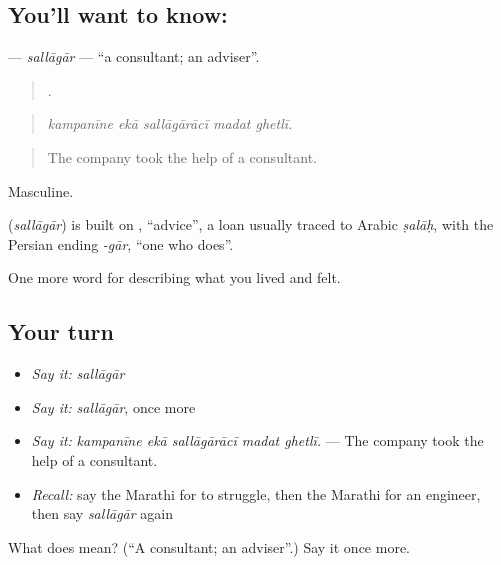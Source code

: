 \subsection*{You'll want to know: }
\textbf{} — \emph{sallāgār} — \textquotedblleft{}a consultant; an adviser\textquotedblright{}.

\begin{quote}
    .
\end{quote}

\begin{quote}
\emph{kampanīne ekā sallāgārācī madat ghetlī.}
\end{quote}

\begin{quote}
The company took the help of a consultant.
\end{quote}

Masculine.

\begin{cousinweb}
\textbf{} (\emph{sallāgār}) is built on , \textquotedblleft{}advice\textquotedblright{}, a loan usually traced to Arabic \emph{ṣalāḥ}, with the Persian ending \emph{-gār}, \textquotedblleft{}one who does\textquotedblright{}.
\end{cousinweb}

\begin{grammarlens}[title={What you've built}]
One more word for describing what you lived and felt.
\end{grammarlens}

\subsection*{Your turn}
\begin{itemize}
\raggedright
  \item \emph{Say it:} \emph{sallāgār}
  \item \emph{Say it:} \emph{sallāgār}, once more
  \item \emph{Say it:} \emph{kampanīne ekā sallāgārācī madat ghetlī.} — The company took the help of a consultant.
  \item \emph{Recall:} say the Marathi for to struggle, then the Marathi for an engineer, then say \emph{sallāgār} again
\end{itemize}

\begin{tcolorbox}[breakable,colback=teal!4,colframe=teal!35!black,title={Before you move on}]
What does  mean? (\textquotedblleft{}A consultant; an adviser\textquotedblright{}.) Say it once more.
\end{tcolorbox}
